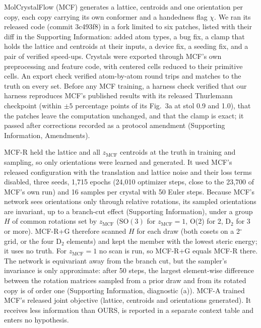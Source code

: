 MolCrystalFlow\cite{zeng2026molcrystalflow} (MCF) generates a lattice, centroids
and one orientation per copy, each copy carrying its own conformer and a handedness
flag $\chi$. We ran its released code (commit 3c493f8) in a fork limited to six
patches, listed with their diff in the Supporting Information: added atom types, a bug
fix, a clamp that holds the lattice and centroids at their inputs, a device fix, a seeding
fix, and a pair of verified speed-ups. Crystals were exported through MCF's own
preprocessing and feature code, with centered cells reduced to their primitive cells. An
export check verified atom-by-atom round trips and matches to the truth on every set.
Before any MCF training, a harness check verified that our harness reproduces MCF's
published results with its released Thurlemann
checkpoint\cite{zeng2026molcrystalflowdata,thurlemann2023regularized} (within $\pm5$
percentage points of its Fig.~3a at stol 0.9 and 1.0), that the patches leave the
computation unchanged, and that the clamp is exact; it passed after corrections recorded
as a protocol amendment (Supporting Information, Amendments).

MCF-R held the lattice and all $z_{\mathrm{MCF}}$ centroids at the truth in
training and sampling, so only orientations were learned and generated. It used
MCF's released configuration with the translation and lattice noise and their loss terms disabled,
three seeds, 1,715 epochs (24,010 optimizer steps, close to the 23,700 of MCF's
own run) and 16 samples per crystal with 50 Euler steps. Because MCF's network sees
orientations only through relative rotations, its sampled orientations are
invariant, up to a branch-cut effect (Supporting Information), under a group $H$ of common
rotations set by $z_{\mathrm{MCF}}$ ($\mathrm{SO}(3)$ for $z_{\mathrm{MCF}}=1$,
O(2) for 2, D$_2$ for 3 or more). MCF-R+G therefore scanned $H$ for each draw
(both cosets on a 2$^\circ$ grid, or the four D$_2$ elements) and kept the member
with the lowest steric energy; it uses no truth. For $z_{\mathrm{MCF}}=1$ no scan is run,
so MCF-R+G equals MCF-R there. The network is equivariant away from the branch cut, but the
sampler's invariance is only approximate: after 50 steps, the largest element-wise
difference between the rotation matrices sampled from a prior draw and from its rotated
copy is of order one (Supporting Information, diagnostic (a)). MCF-A trained MCF's released joint objective (lattice, centroids and
orientations generated). It receives less information than OURS, is reported in a
separate context table and enters no hypothesis.

